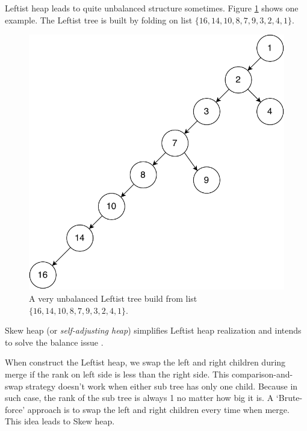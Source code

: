 \documentclass[b5paper]{article}
\begin{document}
Leftist heap leads to quite unbalanced structure sometimes. Figure \ref{fig:unbalanced-leftist-tree}
shows one example. The Leftist tree is built by folding on
list $\{16, 14, 10, 8, 7, 9, 3, 2, 4, 1\}$.

\begin{figure}[htbp]
   \begin{center}
   	  \includegraphics[scale=0.3]{img/unbalanced-leftist-tree}
    \caption{A very unbalanced Leftist tree build from list $\{16, 14, 10, 8, 7, 9, 3, 2, 4, 1\}$.}
    \label{fig:unbalanced-leftist-tree}
   \end{center}
\end{figure}

Skew heap (or {\em self-adjusting heap}) simplifies Leftist heap realization
and intends to solve the balance issue\cite{wiki-skew-heap} \cite{self-adjusting-heaps}.

When construct the Leftist heap, we swap the left and right children during merge
if the rank on left side is less than the right side. This comparison-and-swap strategy
doesn't work when either sub tree has only one child. Because
in such case, the rank of the sub tree is always 1 no matter how
big it is. A `Brute-force' approach is to swap the left and right children
every time when merge. This idea leads to Skew heap.
\end{document}
